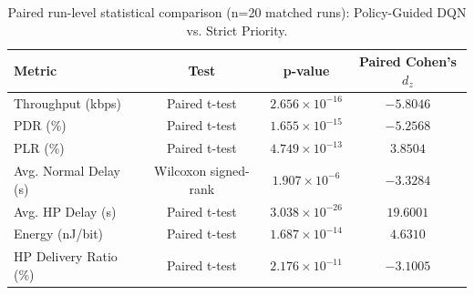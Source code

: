 \begin{table}[t]
\centering
\caption{Paired run-level statistical comparison (n=20 matched runs): Policy-Guided DQN vs. Strict Priority.}
\label{tab:stats}
\scriptsize
\begin{tabular}{lccc}
\toprule
Metric & Test & p-value & Paired Cohen's $d_z$ \\
\midrule
Throughput (kbps) & Paired t-test & $2.656\times10^{-16}$ & $-5.8046$ \\
PDR (\%) & Paired t-test & $1.655\times10^{-15}$ & $-5.2568$ \\
PLR (\%) & Paired t-test & $4.749\times10^{-13}$ & $3.8504$ \\
Avg. Normal Delay (s) & Wilcoxon signed-rank & $1.907\times10^{-6}$ & $-3.3284$ \\
Avg. HP Delay (s) & Paired t-test & $3.038\times10^{-26}$ & $19.6001$ \\
Energy (nJ/bit) & Paired t-test & $1.687\times10^{-14}$ & $4.6310$ \\
HP Delivery Ratio (\%) & Paired t-test & $2.176\times10^{-11}$ & $-3.1005$ \\
\bottomrule
\end{tabular}
\end{table}
